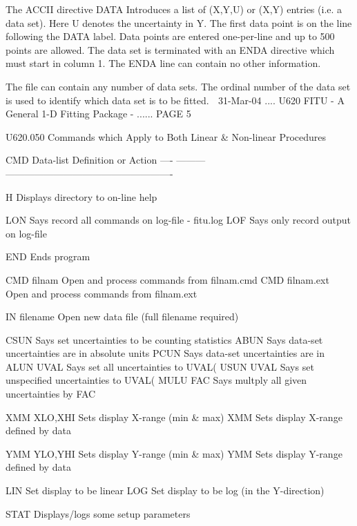    The ACCII directive DATA Introduces a list  of  (X,Y,U)  or  (X,Y)  entries
   (i.e.  a  data  set).  Here  U denotes the uncertainty in Y. The first data
   point is on the line following the DATA  label.  Data  points  are  entered
   one-per-line  and  up to 500 points are allowed. The data set is terminated
   with an ENDA directive which must start in column  1.  The  ENDA  line  can
   contain no other information.
 
   The  file  can  contain  any number of data sets. The ordinal number of the
   data set is used to identify which data set is to be fitted.
    
   31-Mar-04 .... U620  FITU - A General 1-D Fitting Package - ...... PAGE   5
 
 
   U620.050  Commands which Apply to Both Linear & Non-linear Procedures
 
   CMD  Data-list   Definition or Action
   ---- ---------   ----------------------------------------------------
 
   H                Displays directory to on-line help
 
   LON              Says record all commands on log-file - fitu.log
   LOF              Says only record output  on log-file
 
   END              Ends program
 
   CMD  filnam      Open and process commands from filnam.cmd
   CMD  filnam.ext  Open and process commands from filnam.ext
 
   IN   filename    Open new data file (full filename required)
 
   CSUN             Says set uncertainties to be counting statistics
   ABUN             Says data-set uncertainties are in absolute units
   PCUN             Says data-set uncertainties are in %
   ALUN UVAL        Says set all uncertainties to UVAL(%
   USUN UVAL        Says set unspecified uncertainties to UVAL(%
   MULU FAC         Says multply all given uncertainties by FAC
 
   XMM  XLO,XHI     Sets display X-range (min & max)
   XMM              Sets display X-range defined by data
 
   YMM  YLO,YHI     Sets display Y-range (min & max)
   YMM              Sets display Y-range defined by data
 
   LIN              Set display to be linear
   LOG              Set display to be log (in the Y-direction)
 
   STAT             Displays/logs some setup parameters
 
